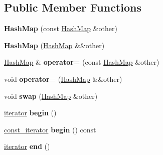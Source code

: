 \subsection*{Public Member Functions}
\begin{DoxyCompactItemize}
\item 
\hypertarget{classemlib_1_1_hash_map_ac211154bbd80b4b73d70302453ff6649}{{\bfseries Hash\+Map} (const \hyperlink{classemlib_1_1_hash_map}{Hash\+Map} \&other)}\label{classemlib_1_1_hash_map_ac211154bbd80b4b73d70302453ff6649}

\item 
\hypertarget{classemlib_1_1_hash_map_aef1e36013f67cbef152f47f3c2dde144}{{\bfseries Hash\+Map} (\hyperlink{classemlib_1_1_hash_map}{Hash\+Map} \&\&other)}\label{classemlib_1_1_hash_map_aef1e36013f67cbef152f47f3c2dde144}

\item 
\hypertarget{classemlib_1_1_hash_map_a4f2ef00514465c3900ee9ddf7a6f62a0}{\hyperlink{classemlib_1_1_hash_map}{Hash\+Map} \& {\bfseries operator=} (const \hyperlink{classemlib_1_1_hash_map}{Hash\+Map} \&other)}\label{classemlib_1_1_hash_map_a4f2ef00514465c3900ee9ddf7a6f62a0}

\item 
\hypertarget{classemlib_1_1_hash_map_a5182995ba941bdc286979f931e554b39}{void {\bfseries operator=} (\hyperlink{classemlib_1_1_hash_map}{Hash\+Map} \&\&other)}\label{classemlib_1_1_hash_map_a5182995ba941bdc286979f931e554b39}

\item 
\hypertarget{classemlib_1_1_hash_map_a0c9f94a2264662d7a1da61eb479477eb}{void {\bfseries swap} (\hyperlink{classemlib_1_1_hash_map}{Hash\+Map} \&other)}\label{classemlib_1_1_hash_map_a0c9f94a2264662d7a1da61eb479477eb}

\item 
\hypertarget{classemlib_1_1_hash_map_a9fb94d714d69752886bd0a7c0f769a96}{\hyperlink{classemlib_1_1_hash_map_1_1iterator}{iterator} {\bfseries begin} ()}\label{classemlib_1_1_hash_map_a9fb94d714d69752886bd0a7c0f769a96}

\item 
\hypertarget{classemlib_1_1_hash_map_a636f12769b0ef6ed4bdb24abe6b5ccc1}{\hyperlink{classemlib_1_1_hash_map_1_1const__iterator}{const\+\_\+iterator} {\bfseries begin} () const }\label{classemlib_1_1_hash_map_a636f12769b0ef6ed4bdb24abe6b5ccc1}

\item 
\hypertarget{classemlib_1_1_hash_map_a64aee42c7cd0db2468ed20e5970fc9b7}{\hyperlink{classemlib_1_1_hash_map_1_1iterator}{iterator} {\bfseries end} ()}\label{classemlib_1_1_hash_map_a64aee42c7cd0db2468ed20e5970fc9b7}


\end{DoxyCompactItemize}
